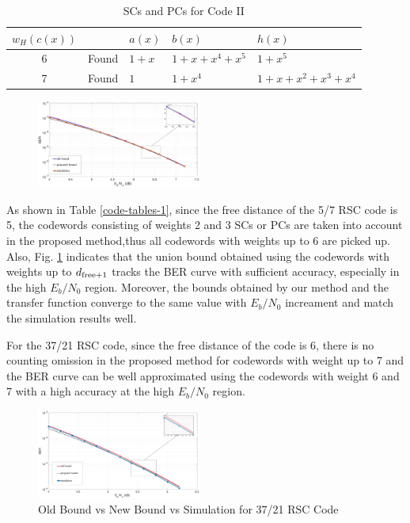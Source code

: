 \begin{table}[htbp]
		\caption{SCs and PCs for Code II}
		\centering
		\begin{tabularx}{0.48\textwidth}{|c|c|XXX} 
			\toprule
			$w_H(c(x))$&~& $a(x)$ & $b(x)$ & $h(x)$ \\ %
			\midrule
			6&Found&$1+x$ & $1+x+x^{4}+x^5$ & $1+x^5$\\
			\cline{1-5}
			7&Found&$1$ & $1+x^4$ & $1+x+x^2+x^3+x^4$\\
			\bottomrule
		\end{tabularx}		
		\label{code-tables-2}
	\end{table}

	
\begin{figure}[hbp]
	\centering
	\includegraphics[width=0.48\textwidth]{./Images/RSC_5_7_lower_weights4.eps}
	\label{simFig1}
\end{figure}

As shown in Table \ref{code-tables-1}, since the free distance of the 5/7 RSC code is 5, the codewords consisting of weights 2 and 3 SCs or PCs are taken into account in the proposed method,thus all codewords with weights up to 6 are picked up. Also, Fig. \ref{simFig1} indicates that the union bound obtained using the codewords with weights up to $d_{\rm free+1}$ tracks the BER curve with sufficient accuracy, especially in the high $E_b/N_0$ region. Moreover, the bounds obtained by our method and the transfer function converge to the same value with $E_b/N_0$ increament and match the simulation results well.  

For the 37/21 RSC code, since the free distance of the code is 6, there is no counting omission in the proposed method for codewords with weight up to 7 and the BER curve can be well approximated using the codewords with weight 6 and 7 with a high accuracy at the high $E_b/N_0$ region.

\begin{figure}[htbp]
	\centering
	\includegraphics[width=0.48\textwidth]{./Images/RSC_37_21_lower_weights4.eps}
	\caption{Old Bound vs New Bound vs Simulation for 37/21 RSC Code}
	\label{simFig2}
\end{figure}

